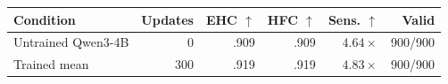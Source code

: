 \begin{tabular}{lrrrrr}
\toprule
Condition & Updates & EHC $\uparrow$ & HFC $\uparrow$ & Sens. $\uparrow$ & Valid \\
\midrule
Untrained Qwen3-4B & 0   & .909 & .909 & $4.64\times$ & 900/900 \\
Trained mean       & 300 & .919 & .919 & $4.83\times$ & 900/900 \\
\bottomrule
\end{tabular}

